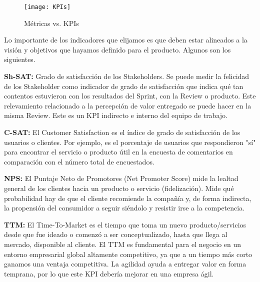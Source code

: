 \begin{figure}[h]
  \centering
  \texttt{[image: KPIs]}
  \caption{Métricas vs. KPIs}
  \centering
  \label{fig:KPIs} %
\end{figure}
\FloatBarrier %

Lo importante de los indicadores que elijamos es que deben estar alineados a la visión y objetivos que hayamos definido para el producto.
Algunos son los siguientes.



  \begin{description}
 
  \item {\textbf{Sh-SAT:} Grado de satisfacción de los Stakeholders. Se puede medir la felicidad de los Stakeholder como indicador de grado de satisfacción que indica qué tan contentos estuvieron con los resultados del Sprint, con la Review o producto. Este relevamiento relacionado a la percepción de valor entregado se puede hacer en la misma Review. Este es un KPI indirecto e interno del equipo de trabajo.
}

  \item {\textbf{C-SAT:} El Customer Satisfaction es el índice de grado de satisfacción de los usuarios o clientes. Por ejemplo, es el porcentaje de usuarios que respondieron "sí" para encontrar el servicio o producto útil en la encuesta de comentarios en comparación con el número total de encuestados.
}

  \item {\textbf{NPS:} El Puntaje Neto de Promotores (Net Promoter Score) mide la lealtad general de los clientes hacia un producto o servicio (fidelización). Mide qué probabilidad hay de que el cliente recomiende la compañía y, de forma indirecta, la propensión del consumidor a seguir siéndolo y resistir irse a la competencia.
}

  \item {\textbf{TTM:} El Time-To-Market es el tiempo que toma un nuevo producto/servicios desde que fue ideado o comenzó a ser conceptualizado, hasta que llega al mercado, disponible al cliente. El TTM es fundamental para el negocio en un entorno empresarial global altamente competitivo, ya que a un tiempo más corto ganamos una ventaja competitiva. La agilidad ayuda a entregar valor en forma temprana, por lo que este KPI debería mejorar en una empresa ágil.
}


\end{description}
